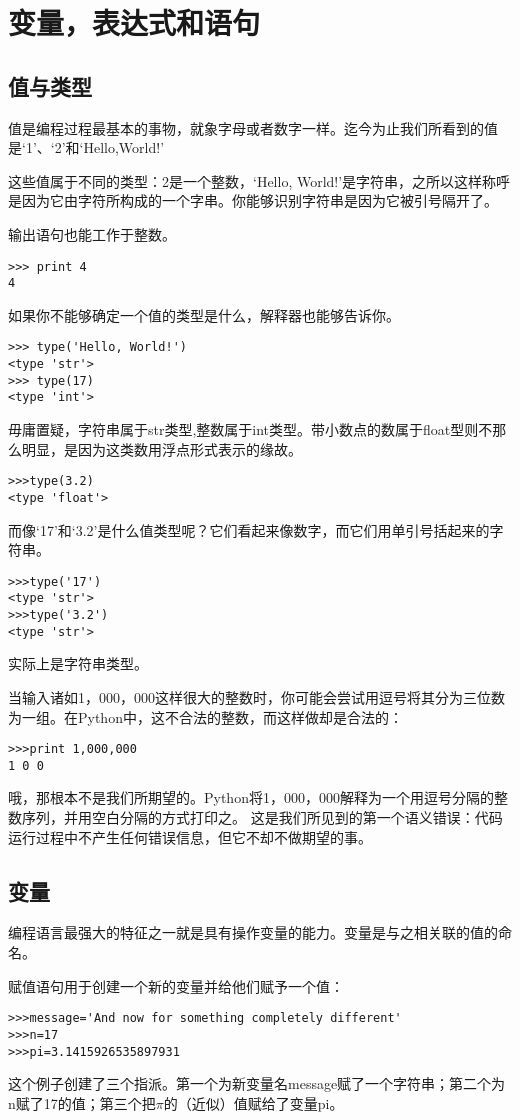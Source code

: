 \chapter{变量，表达式和语句}
\section{值与类型}
值是编程过程最基本的事物，就象字母或者数字一样。迄今为止我们所看到的值是‘1’、‘2’和‘Hello,World!’

这些值属于不同的类型：2是一个整数，‘Hello, World!’是字符串，之所以这样称呼是因为它由字符所构成的一个字串。你能够识别字符串是因为它被引号隔开了。

输出语句也能工作于整数。
\begin{lstlisting}
>>> print 4
4
\end{lstlisting}
如果你不能够确定一个值的类型是什么，解释器也能够告诉你。

\begin{lstlisting}
>>> type('Hello, World!')
<type 'str'>
>>> type(17)
<type 'int'>
\end{lstlisting}

毋庸置疑，字符串属于str类型,整数属于int类型。带小数点的数属于float型则不那么明显，是因为这类数用浮点形式表示的缘故。

\begin{lstlisting}
>>>type(3.2)
<type 'float'>
\end{lstlisting}

而像‘17’和‘3.2’是什么值类型呢？它们看起来像数字，而它们用单引号括起来的字符串。
\begin{lstlisting}
>>>type('17')
<type 'str'>
>>>type('3.2')
<type 'str'>
\end{lstlisting}
实际上是字符串类型。

当输入诸如1，000，000这样很大的整数时，你可能会尝试用逗号将其分为三位数为一组。在Python中，这不合法的整数，而这样做却是合法的：
\begin{lstlisting}
>>>print 1,000,000
1 0 0
\end{lstlisting}
哦，那根本不是我们所期望的。Python将1，000，000解释为一个用逗号分隔的整数序列，并用空白分隔的方式打印之。
这是我们所见到的第一个语义错误：代码运行过程中不产生任何错误信息，但它不却不做期望的事。
\section{变量}
编程语言最强大的特征之一就是具有操作变量的能力。变量是与之相关联的值的命名。

赋值语句用于创建一个新的变量并给他们赋予一个值：
\begin{lstlisting}
>>>message='And now for something completely different'
>>>n=17
>>>pi=3.1415926535897931
\end{lstlisting}
这个例子创建了三个指派。第一个为新变量名message赋了一个字符串；第二个为n赋了17的值；第三个把$\pi$的（近似）值赋给了变量pi。


